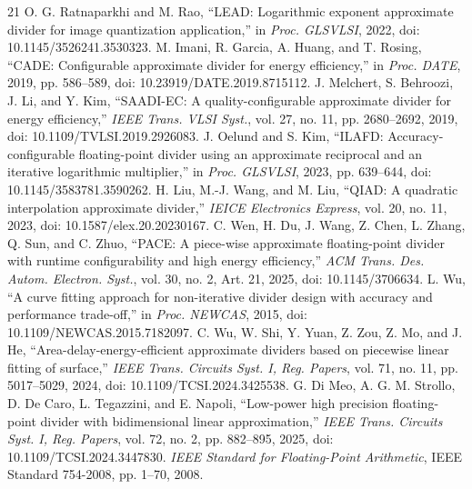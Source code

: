 \documentclass[conference]{IEEEtran}
\begin{document}
\begin{thebibliography}{21}
O. G. Ratnaparkhi and M. Rao, ``LEAD: Logarithmic exponent approximate divider
for image quantization application,'' in \emph{Proc. GLSVLSI}, 2022,
doi: 10.1145/3526241.3530323.
M. Imani, R. Garcia, A. Huang, and T. Rosing, ``CADE: Configurable approximate
divider for energy efficiency,'' in \emph{Proc. DATE}, 2019, pp. 586--589,
doi: 10.23919/DATE.2019.8715112.
J. Melchert, S. Behroozi, J. Li, and Y. Kim, ``SAADI-EC: A quality-configurable
approximate divider for energy efficiency,'' \emph{IEEE Trans. VLSI Syst.},
vol. 27, no. 11, pp. 2680--2692, 2019,
doi: 10.1109/TVLSI.2019.2926083.
J. Oelund and S. Kim, ``ILAFD: Accuracy-configurable floating-point divider
using an approximate reciprocal and an iterative logarithmic multiplier,'' in
\emph{Proc. GLSVLSI}, 2023, pp. 639--644,
doi: 10.1145/3583781.3590262.
H. Liu, M.-J. Wang, and M. Liu, ``QIAD: A quadratic interpolation approximate
divider,'' \emph{IEICE Electronics Express}, vol. 20, no. 11, 2023,
doi: 10.1587/elex.20.20230167.
C. Wen, H. Du, J. Wang, Z. Chen, L. Zhang, Q. Sun, and C. Zhuo,
``PACE: A piece-wise approximate floating-point divider with runtime
configurability and high energy efficiency,'' \emph{ACM Trans. Des. Autom.
Electron. Syst.}, vol. 30, no. 2, Art. 21, 2025,
doi: 10.1145/3706634.
L. Wu, ``A curve fitting approach for non-iterative divider design with
accuracy and performance trade-off,'' in \emph{Proc. NEWCAS}, 2015,
doi: 10.1109/NEWCAS.2015.7182097.
C. Wu, W. Shi, Y. Yuan, Z. Zou, Z. Mo, and J. He,
``Area-delay-energy-efficient approximate dividers based on piecewise linear
fitting of surface,'' \emph{IEEE Trans. Circuits Syst. I, Reg. Papers},
vol. 71, no. 11, pp. 5017--5029, 2024,
doi: 10.1109/TCSI.2024.3425538.
G. Di Meo, A. G. M. Strollo, D. De Caro, L. Tegazzini, and E. Napoli,
``Low-power high precision floating-point divider with bidimensional linear
approximation,'' \emph{IEEE Trans. Circuits Syst. I, Reg. Papers}, vol. 72,
no. 2, pp. 882--895, 2025, doi: 10.1109/TCSI.2024.3447830.
\emph{IEEE Standard for Floating-Point Arithmetic}, IEEE Standard 754-2008,
pp. 1--70, 2008.
\end{thebibliography}
\end{document}
